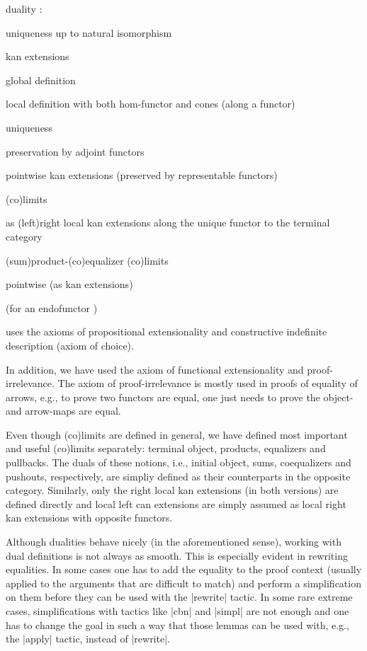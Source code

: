 \documentclass[9pt, twocolumn]{extarticle}
\renewenvironment{itemize}[1]{\begin{compactitem}#1}{\end{compactitem}}
\begin{document}
\begin{itemize}[\tiny]
\begin{itemize}
	\item duality : 
	\item uniqueness up to natural isomorphism
	\end{itemize}
\item kan extensions
	\begin{itemize}
	\item global definition
	\item local definition with both hom-functor and cones (along a functor)
	\item uniqueness
	\item preservation by adjoint functors
	\item pointwise kan extensions (preserved by representable functors)
	\end{itemize}
\item (co)limits
	\begin{itemize}
	\item as (left)right local kan extensions along the unique functor to the terminal category
	\item (sum)product-(co)equalizer (co)limits
	\item pointwise (as kan extensions)
	\end{itemize}
\item  (for an endofunctor )
\item[] \textsuperscript{}uses the axioms of propositional extensionality and constructive indefinite description (axiom of choice).
\end{itemize}

In addition, we have used the axiom of functional extensionality and proof-irrelevance.
The axiom of proof-irrelevance is mostly used in proofs of equality of arrows, e.g., to prove two functors are equal, one just needs to prove the object- and arrow-maps are equal.

Even though (co)limits are defined in general, we have defined most important and useful (co)limits separately: terminal object, products, equalizers and pullbacks.
The duals of these notions, i.e., initial object, sums, coequalizers and pushouts, respectively, are simpliy defined as their counterparts in the opposite category.
Similarly, only the right local kan extensions (in both versions) are defined directly and local left can extensions are simply assumed as local right kan extensions with opposite functors.

Although dualities behave nicely (in the aforementioned sense), working with dual definitions is not always as smooth.
This is especially evident in rewriting equalities.
In some cases one has to add the equality to the proof context (usually applied to the arguments that are difficult to match) and perform a simplification on them before they can be used with the \Coqe|rewrite| tactic.
In some rare extreme cases, simplifications with tactics like \Coqe|cbn| and \Coqe|simpl| are not enough and one has to change the goal in such a way that those lemmas can be used with, e.g., the \Coqe|apply| tactic, instead of \Coqe|rewrite|.
\end{document}

